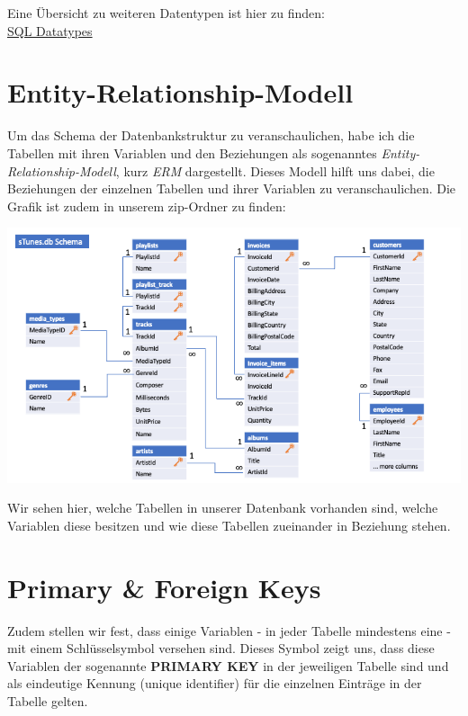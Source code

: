 \documentclass[
]{book}
\begin{document}
Eine Übersicht zu weiteren Datentypen ist hier zu finden:\\
\href{https://www.tutorialspoint.com/sqlite/sqlite_data_types.htm}{SQL Datatypes}

\hypertarget{entity-relationship-modell}{%
\section{Entity-Relationship-Modell}\label{entity-relationship-modell}}

Um das Schema der Datenbankstruktur zu veranschaulichen, habe ich die Tabellen mit ihren Variablen und den Beziehungen als sogenanntes \emph{Entity-Relationship-Modell}, kurz \emph{ERM} dargestellt. Dieses Modell hilft uns dabei, die Beziehungen der einzelnen Tabellen und ihrer Variablen zu veranschaulichen. Die Grafik ist zudem in unserem zip-Ordner zu finden:

\includegraphics[width=10.41667in,height=\textheight]{img-sTunes-Schema.png}

Wir sehen hier, welche Tabellen in unserer Datenbank vorhanden sind, welche Variablen diese besitzen und wie diese Tabellen zueinander in Beziehung stehen.

\hypertarget{primary-foreign-keys}{%
\section{Primary \& Foreign Keys}\label{primary-foreign-keys}}

Zudem stellen wir fest, dass einige Variablen - in jeder Tabelle mindestens eine - mit einem Schlüsselsymbol versehen sind. Dieses Symbol zeigt uns, dass diese Variablen der sogenannte \textbf{PRIMARY KEY} in der jeweiligen Tabelle sind und als eindeutige Kennung (unique identifier) für die einzelnen Einträge in der Tabelle gelten.
\end{document}
